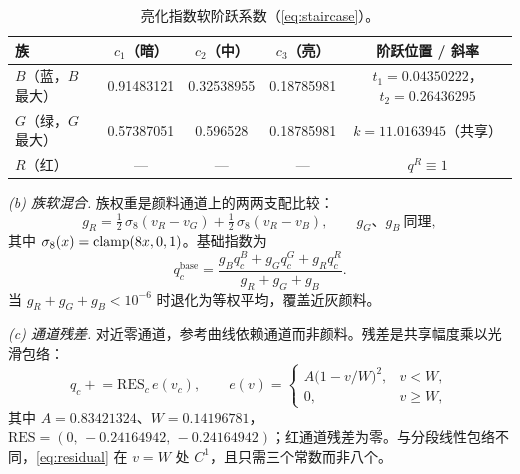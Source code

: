 \begin{table}[t]
\centering
\small
\caption{亮化指数软阶跃系数（\cref{eq:staircase}）。}
\label{tab:softstep}
\begin{tabular}{lcccc}
\toprule
族 & $c_{1}$（暗） & $c_{2}$（中） & $c_{3}$（亮） & 阶跃位置 / 斜率 \\
\midrule
$B$（蓝，$B$ 最大） & 0.91483121 & 0.32538955 & 0.18785981 & $t_{1}=0.04350222$，$t_{2}=0.26436295$ \\
$G$（绿，$G$ 最大） & 0.57387051 & 0.596528 & 0.18785981 & $k=11.0163945$（共享） \\
$R$（红） & --- & --- & --- & $q^{R}\equiv1$ \\
\bottomrule
\end{tabular}
\end{table}

\emph{(b) 族软混合.} 族权重是颜料通道上的两两支配比较：
\begin{equation}
g_{R}=\tfrac12\,\sigma_{8}(v_{R}-v_{G})+\tfrac12\,\sigma_{8}(v_{R}-v_{B}),
\qquad g_{G}、g_{B}\ \text{同理},
\label{eq:family-weights}
\end{equation}
其中 $\sigma_{8}(x)=\operatorname{clamp}(8x,0,1)$。基础指数为
\begin{equation}
q_{c}^{\mathrm{base}}=\frac{g_{B}q_{c}^{B}+g_{G}q_{c}^{G}+g_{R}q_{c}^{R}}{g_{R}+g_{G}+g_{B}}.
\label{eq:qbase}
\end{equation}
当 $g_{R}+g_{G}+g_{B}<10^{-6}$ 时退化为等权平均，覆盖近灰颜料。

\emph{(c) 通道残差.} 对近零通道，参考曲线依赖通道而非颜料。残差是共享幅度乘以光滑包络：
\begin{equation}
q_{c}\mathrel{+}=\mathrm{RES}_{c}\,e(v_{c}),\qquad
e(v)=
\begin{cases}
A\bigl(1-v/W\bigr)^{2}, & v<W,\\
0, & v\ge W,
\end{cases}
\label{eq:residual}
\end{equation}
其中 $A=0.83421324$、$W=0.14196781$，$\mathrm{RES}=(0,\,-0.24164942,\,-0.24164942)$；红通道残差为零。与分段线性包络不同，\cref{eq:residual} 在 $v=W$ 处 $C^{1}$，且只需三个常数而非八个。

